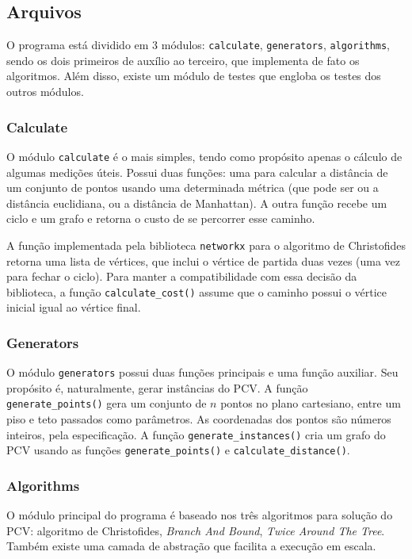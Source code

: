 \documentclass{article}
\begin{document}
\subsection{Arquivos}
O programa está dividido em 3 módulos: \texttt{calculate}, \texttt{generators}, \texttt{algorithms}, sendo os dois primeiros de auxílio ao terceiro, que implementa de fato os algoritmos. Além disso, existe um módulo de testes que engloba os testes dos outros módulos.

\subsubsection{Calculate}

O módulo \texttt{calculate} é o mais simples, tendo como propósito apenas o cálculo de algumas medições úteis. Possui duas funções: uma para calcular a distância de um conjunto de pontos usando uma determinada métrica (que pode ser ou a distância euclidiana, ou a distância de Manhattan). A outra função recebe um ciclo e um grafo e retorna o custo de se percorrer esse caminho.

A função implementada pela biblioteca \texttt{networkx} para o algoritmo de Christofides retorna uma lista de vértices, que inclui o vértice de partida duas vezes (uma vez para fechar o ciclo). Para manter a compatibilidade com essa decisão da biblioteca, a função \texttt{calculate\_cost()} assume que o caminho possui o vértice inicial igual ao vértice final.

\subsubsection{Generators}

O módulo \texttt{generators} possui duas funções principais e uma função auxiliar. Seu propósito é, naturalmente, gerar instâncias do PCV. A função \texttt{generate\_points()} gera um conjunto de \( n \) pontos no plano cartesiano, entre um piso e teto passados como parâmetros. As coordenadas dos pontos são números inteiros, pela especificação. A função \texttt{generate\_instances()} cria um grafo do PCV usando as funções \texttt{generate\_points()} e \texttt{calculate\_distance()}.


\subsubsection{Algorithms}

O módulo principal do programa é baseado nos três algoritmos para solução do PCV: algoritmo de Christofides, \textit{Branch And Bound}, \textit{Twice Around The Tree}. Também existe uma camada de abstração que facilita a execução em escala.
\end{document}
